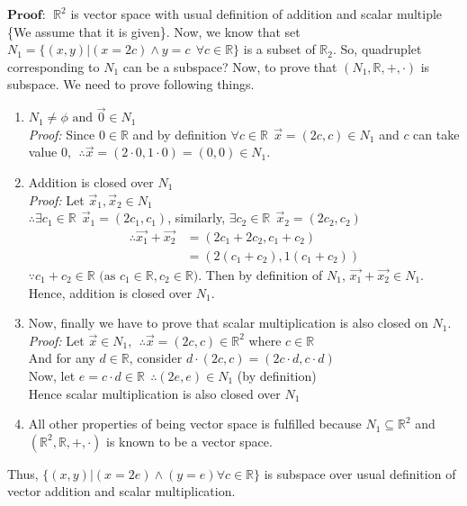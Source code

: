 \documentclass{article}
\begin{document}
$\boldsymbol{Proof:}~~ \mathbb{R}^2$ is vector space with usual definition of addition and scalar multiple \{We assume that it is given\}. Now, we know that set $N_1 = \{(x,y) | (x = 2c) \wedge y = c ~~\forall c \in \mathbb{R}\}$ is a subset of $\mathbb{R}_2$. So, quadruplet corresponding to $N_1$ can be a subspace? Now, to prove that $(N_1,\mathbb{R}, +,\cdot)$ is subspace. We need to prove following things.
\begin{enumerate}
    \item \begin{math} N_1 \neq \phi\text{ and }\vec{0} \in N_1 \end{math} \\ 
     \textit{Proof:} Since $0 \in \mathbb{R}$ and by definition $\forall c\in \mathbb{R} ~~\vec{x} = (2c,c)\in N_1 $ and $c$ can take value $0,~~\therefore \vec{x} = (2\cdot 0, 1\cdot 0) = (0, 0) \in N_1$.
    
    
    \item Addition is closed over $N_1$\\
    \textit{Proof:} Let \begin{math} \vec{x}_1, \vec{x}_2 \in N_1 \end{math} \\ $\therefore \exists c_1\in \mathbb{R}~~ \vec{x}_1 = (2c_1, c_1)$, similarly, $\exists c_2\in \mathbb{R}~~ \vec{x}_2 = (2c_2, c_2)$ 
    \begin{align}
        \therefore \vec{x_1} + \vec{x_2} &= (2c_1 + 2c_2, c_1+c_2) \nonumber \\
                                     &= (2(c_1 + c_2), 1(c_1 + c_2)) \nonumber
    \end{align}  
    \begin{math}\because c_1 + c_2 \in \mathbb{R}\text{ (as }c_1 \in \mathbb{R}, c_2 \in \mathbb{R})\end{math}. Then by definition of $N_1$, \begin{math} \vec{x_1} + \vec{x_2} \in N_1\end{math}.
    Hence, addition is closed over $N_1$.
    
    \item Now, finally we have to prove that scalar multiplication is also closed on $N_1$.\\
    \textit{Proof:} Let \begin{math} \vec{x}\in N_1, ~~\therefore \vec{x} = (2c, c) \in \mathbb{R}^2 \end{math} where \begin{math} c \in \mathbb{R} \end{math}\\
And for any $d \in \mathbb{R}$, consider $d\cdot(2c, c) = (2c\cdot d,c\cdot d)$ \\ 
Now, let $e = c\cdot d \in \mathbb{R} ~~\therefore (2e, e) \in N_1$ (by definition)\\
Hence scalar multiplication is also closed over $N_1$
    \item All other properties of being vector space is fulfilled because $N_1\subseteq \mathbb{R}^2$ and $(\mathbb{R}^2,\mathbb{R},+,\cdot)$ is known to be a vector space.
\end{enumerate}
 Thus, $\{(x, y)| (x=2e) \wedge (y = e) \forall c \in \mathbb{R}\}$ is subspace over usual definition of vector addition and scalar multiplication.
\end{document}
